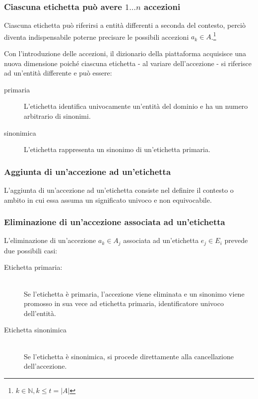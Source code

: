 \documentclass[10pt,a4paper,headinclude,footinclude,hidelinks]{scrreprt} %
\begin{document}
	\subsubsection{Ciascuna etichetta può avere $1\ldots n$ accezioni}
	Ciascuna etichetta può riferirsi a entità differenti a seconda del contesto, perciò diventa indispensabile poterne precisare le possibili accezioni $a_k \in A$.\footnote{$k \in \mathbb{N}, k \leq t=\left|A\right|$}
	
	Con l'introduzione delle accezioni, il dizionario della piattaforma acquisisce una nuova dimensione poiché ciascuna etichetta - al variare dell'accezione - si riferisce ad un'entità differente e può essere:
	\begin{description}
	\item[primaria] L'etichetta identifica univocamente un'entità del dominio e ha un numero arbitrario di sinonimi.
	\item[sinonimica] L'etichetta rappresenta un sinonimo di un'etichetta primaria.
	\end{description}


	\subsubsection{Aggiunta di un'accezione ad un'etichetta}
	L'aggiunta di un'accezione ad un'etichetta consiste nel definire il contesto o ambito in cui essa assuma un significato univoco e non equivocabile.

	\subsubsection{Eliminazione di un'accezione associata ad un'etichetta}
	L'eliminazione di un'accezione $a_k \in A_j$ associata ad un'etichetta $e_j \in E_i$ prevede due possibili casi:
	\begin{description}
	\item[Etichetta primaria:] \hfill \\
	Se l'etichetta è primaria, l'accezione viene eliminata e un sinonimo viene promosso in sua vece ad etichetta primaria, identificatore univoco dell'entità.
 	\item[Etichetta sinonimica] \hfill \\
	Se l'etichetta è sinonimica, si procede direttamente alla cancellazione dell'accezione.
	\end{description}
\end{document}
